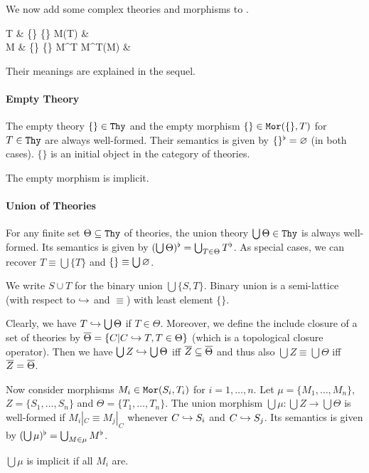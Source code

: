We now add some complex theories and morphisms to \mmt.
\begin{grammar}
T      & \{\} \alt \bigcup\{\} \alt M(T)   & \\
M      & \{\} \alt \bigcup\{\} \alt M^T \alt M^T(M)   & 
\end{grammar}

Their meanings are explained in the sequel.

\paragraph{Empty Theory}
The empty theory $\{\}\in\mathtt{Thy}$ and the empty morphism $\{\}\in\mathtt{Mor}(\{\},T)$ for $T\in\mathtt{Thy}$ are always well-formed.
Their semantics is given by $\{\}^\flat=\varnothing$ (in both cases).
$\{\}$ is an initial object in the category of theories.

The empty morphism is implicit.

\paragraph{Union of Theories}
For any finite set $\Theta\subseteq\mathtt{Thy}$ of theories, the union theory $\bigcup \Theta\in\mathtt{Thy}$ is always well-formed.
Its semantics is given by $(\bigcup\Theta)^\flat=\bigcup_{T\in\Theta}T^\flat$.
As special cases, we can recover $T\equiv\bigcup\{T\}$ and $\{\}\equiv\bigcup\varnothing$.

We write $S\cup T$ for the binary union $\bigcup\{S,T\}$.
Binary union is a semi-lattice (with respect to $\hookrightarrow$ and $\equiv$) with least element $\{\}$.

Clearly, we have $T\hookrightarrow \bigcup\Theta$ if $T\in\Theta$.
Moreover, we define the include closure of a set of theories by $\overline{\Theta}=\{C|C\hookrightarrow T, T\in\Theta\}$ (which is a topological closure operator).
Then we have $\bigcup Z\hookrightarrow \bigcup \Theta$ iff $\overline{Z}\subseteq\overline{\Theta}$ and thus also $\bigcup Z\equiv \bigcup \Theta$ iff $\overline{Z}=\overline{\Theta}$.


Now consider morphisms $M_i\in\mathtt{Mor}(S_i,T_i)$ for $i=1,\ldots,n$.
Let $\mu=\{M_1,\ldots,M_n\}$, $Z=\{S_1,\ldots,S_n\}$ and $\Theta=\{T_1,\ldots,T_n\}$.
The union morphism $\bigcup \mu: \bigcup Z \to \bigcup \Theta$ is well-formed if $M_i|_C\equiv M_j|_C$ whenever $C\hookrightarrow S_i$ and $C\hookrightarrow S_j$.
Its semantics is given by $(\bigcup \mu)^\flat=\bigcup_{M\in\mu} M^\flat$.

$\bigcup \mu$ is implicit if all $M_i$ are.

